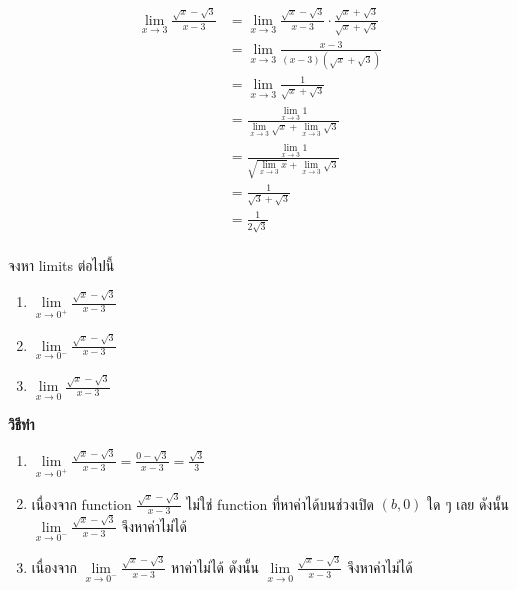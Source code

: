 \documentclass[
]{book}
\begin{document}
\begin{equation}
  \begin{aligned}
    \lim_{x\rightarrow 3}\frac{\sqrt{x}-\sqrt{3}}{x-3}
    &= \lim_{x\rightarrow 3}\frac{\sqrt{x}-\sqrt{3}}{x-3}\cdot \frac{\sqrt{x}+\sqrt{3}}{\sqrt{x}+\sqrt{3}} \\
    &= \lim_{x\rightarrow 3}\frac{x-3}{\left( x-3\right) \left( \sqrt{x}+\sqrt{3}\right) } \\
    &= \lim_{x\rightarrow 3}\frac{1}{\sqrt{x}+\sqrt{3}}\\
    &= \frac{\lim_{x\rightarrow 3}1}{\lim_{x\rightarrow 3} \sqrt{x} + \lim_{x\rightarrow 3} \sqrt{3}} \\
    &= \frac{\lim_{x\rightarrow 3}1}{\sqrt{\lim_{x\rightarrow 3}x}+\lim_{x\rightarrow 3}\sqrt{3}} \\
    &= \frac{1}{\sqrt{3}+\sqrt{3}} \\
    &= \frac{1}{2\sqrt{3}} \\
  \end{aligned}
\end{equation}

\label{ex-limit-5}
จงหา limits ต่อไปนี้

\begin{enumerate}
\def\labelenumi{\arabic{enumi}.}
\item
  \(\underset{x\rightarrow 0^{+}}{\lim}\frac{\sqrt{x}-\sqrt{3}}{x-3}\)
\item
  \(\underset{x\rightarrow 0^{-}}{\lim}\frac{\sqrt{x}-\sqrt{3}}{x-3}\)
\item
  \(\underset{x\rightarrow 0}{\lim}\frac{\sqrt{x}-\sqrt{3}}{x-3}\)
\end{enumerate}

\textbf{วิธีทำ}

\begin{enumerate}
\def\labelenumi{\arabic{enumi}.}
\item
  \(\underset{x\rightarrow 0^{+}}{\lim}\frac{\sqrt{x}-\sqrt{3}}{x-3}\)\(=\frac{0-\sqrt{3}}{x-3}=\frac{\sqrt{3}}{3}\)
\item
  เนื่องจาก function \(\frac{\sqrt{x}-\sqrt{3}}{x-3}\) ไม่ใช่ function
  ที่หาค่าได้บนช่วงเปิด \(\left( b,0\right)\) ใด ๆ เลย ดังนั้น
  \(\underset{x\rightarrow 0^{-}}{\lim}\frac{\sqrt{x}-\sqrt{3}}{x-3}\)
  จึงหาค่าไม่ได้
\item
  เนื่องจาก
  \(\underset{x\rightarrow 0^{-}}{\lim}\frac{\sqrt{x}-\sqrt{3}}{x-3}\)
  หาค่าไม่ได้ ดังนั้น
  \(\underset{x\rightarrow 0}{\lim}\frac{\sqrt{x}-\sqrt{3}}{x-3}\)
  จึงหาค่าไม่ได้
\end{enumerate}
\end{document}
